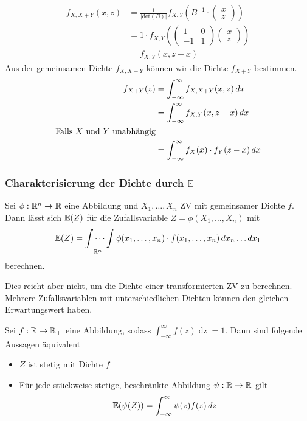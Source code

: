\begin{align*}
    f_{X, X+Y}(x, z) &= \frac{1}{|\text{det}(B)|}f_{X, Y}\left(B^{-1}\cdot 
    \left(\begin{matrix}
        x\\
        z
    \end{matrix}\right)\right)\\
    &= 1 \cdot f_{X, Y}\left(\left(\begin{matrix}
        1 & 0\\
        -1 & 1
    \end{matrix}\right)\left(\begin{matrix}
        x\\
        z
    \end{matrix}\right)\right)\\
    &= f_{X, Y}\left(x, z-x\right)
\end{align*}
Aus der gemeinsamen Dichte $f_{X, X + Y}$ können wir die Dichte $f_{X + Y}$ bestimmen.
\begin{align*}
    f_{X+Y}(z) &= \int_{-\infty}^{\infty}f_{X, X + Y}(x, z) \mathop{dx}\\
    &= \int_{-\infty}^{\infty} f_{X,Y}(x, z-x) \mathop{dx}\\
    \text{Falls $X$ und $Y$ unabhängig}\\
    &= \int_{-\infty}^{\infty}f_X(x)\cdot f_Y(z-x) \mathop{dx}
\end{align*}
\subsubsection{Charakterisierung der Dichte durch \(\mathbb{E}\)}
    Sei $\phi: \mathbb{R}^n \to \mathbb{R}$ eine Abbildung und $X_1, \ldots, X_n$ ZV mit gemeinsamer Dichte $f$. 
    Dann lässt sich $\mathbb{E}(Z)$ für die Zufallsvariable $Z=\phi(X_1, \ldots, X_n)$ mit 
    $$\mathbb{E}(Z) =\idotsint\limits_{\mathbb{R}^n}\phi(x_1, \ldots, x_n)\cdot f(x_1, \ldots, x_n)\mathop{dx_n}\ldots\mathop{dx_1}$$
    berechnen.

Dies reicht aber nicht, um die Dichte einer transformierten ZV zu berechnen. Mehrere Zufallsvariablen mit unterschiedlichen Dichten können den gleichen Erwartungswert haben.

\begin{subbox}{}
    Sei $f: \mathbb{R} \to \mathbb{R}_+$ eine Abbildung, sodass $\int_{-\infty}^{\infty}f(z)\mathop{dz} = 1$. Dann sind folgende Aussagen äquivalent
    \begin{itemize}
        \item $Z$ ist stetig mit Dichte $f$
        \item Für jede stückweise stetige, beschränkte Abbildung $\psi: \mathbb{R} \to \mathbb{R}$ gilt 
        \[\mathbb{E}(\psi(Z)) = \int_{-\infty}^{\infty}\psi(z)f(z)\mathop{dz}\]
    \end{itemize}
\end{subbox}


